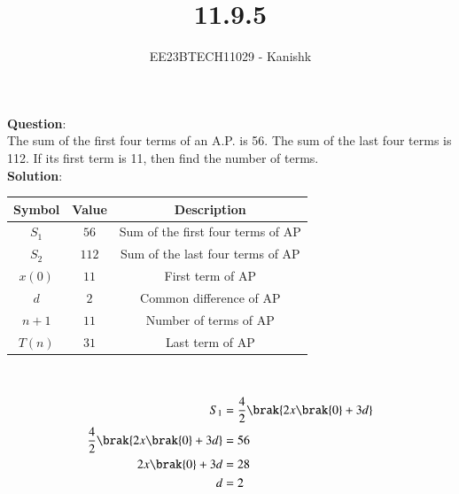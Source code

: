 \documentclass[journal,12pt,twocolumn]{IEEEtran}
\theoremstyle{remark}
\begin{document}

\vspace{3cm}

\title{11.9.5}
\author{EE23BTECH11029 - Kanishk}
\maketitle

\bigskip



\renewcommand{\thefigure}{\theenumi}
\renewcommand{\thetable}{\theenumi}
\textbf{Question}:\\ 
The sum of the first four terms of an A.P. is 56. The sum of the last four terms is
112. If its first term is 11, then find the number of terms.\\

\textbf{Solution}:\\ 

\footnotesize
\centering
\begin{tabular}{|c|c|c|}
\hline
Symbol & Value & Description\\
\hline
$S_1$ & $56$ & Sum of the first four terms of AP\\
\hline
$S_2$ & $112$& Sum of the last four terms of AP\\
\hline
$x(0)$ & $11$ & First term of AP \\
\hline
$d$ &$ 2$ & Common difference of AP\\
\hline
$n+1$ & $11$ & Number of terms of AP\\
\hline
$T(n)$ & $31$ & Last term of AP\\
\hline

\end{tabular}
\\
\small


\begin{align}
S_1&=\frac{4}{2}\brak{2x\brak{0}+3d}\\
\frac{4}{2}\brak{2x\brak{0}+3d}&=56\\
2x\brak{0}+3d&=28\\
d&=2
\end{align}
\end{document}
